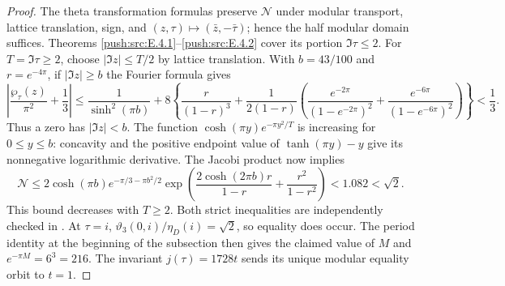 \begin{proof}
The theta transformation formulas preserve $\mathcal N$ under modular
transport, lattice translation, sign, and
$(z,\tau)\mapsto(\bar z,-\bar\tau)$; hence the half modular domain
suffices. Theorems \ref{push:src:E.4.1}--\ref{push:src:E.4.2} cover its portion $\Im\tau\leq2$.
For $T=\Im\tau\geq2$, choose $|\Im z|\leq T/2$ by lattice
translation. With $b=43/100$ and $r=e^{-4\pi}$, if
$|\Im z|\geq b$ the Fourier formula gives
\[
 \left|\frac{\wp_\tau(z)}{\pi^2}+\frac13\right|
 \leq\frac1{\sinh^2(\pi b)}+
 8\left\{\frac r{(1-r)^3}
 +\frac1{2(1-r)}\left(
 \frac{e^{-2\pi}}{(1-e^{-2\pi})^2}+
 \frac{e^{-6\pi}}{(1-e^{-6\pi})^2}\right)\right\}<\frac13.
\]
Thus a zero has $|\Im z|<b$. The function
$\cosh(\pi y)e^{-\pi y^2/T}$ is increasing for $0\leq y\leq b$:
concavity and the positive endpoint value of $\tanh(\pi y)-y$
give its nonnegative logarithmic derivative. The Jacobi product now
implies
\[
 \mathcal N\leq2\cosh(\pi b)
 e^{-\pi/3-\pi b^2/2}
 \exp\left(\frac{2\cosh(2\pi b)r}{1-r}
                +\frac{r^2}{1-r^2}\right)<1.082<\sqrt2.
\]
This bound decreases with $T\geq2$. Both strict inequalities are
independently checked in .
At $\tau=i$, $\vartheta_3(0,i)/\eta_D(i)=\sqrt2$, so equality
does occur. The period identity at the beginning of the subsection
then gives the claimed value of $M$ and
$e^{-\pi M}=6^3=216$. The invariant $j(\tau)=1728t$ sends its
unique modular equality orbit to $t=1$.
\end{proof}



\clearpage\appendix
